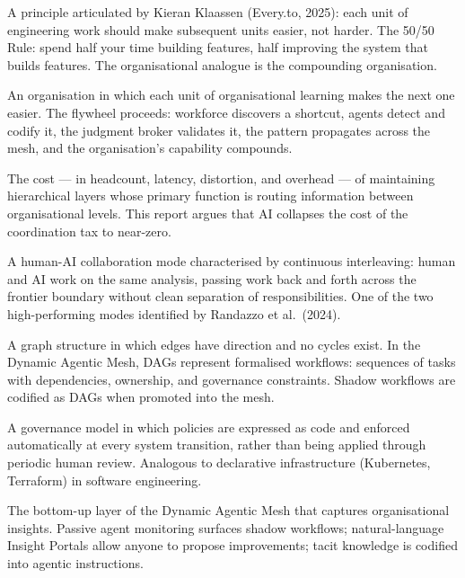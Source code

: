 \begin{description}[style=nextline, leftmargin=2em, font=\bfseries\color{navyblue}]
\item[Compound Engineering]
A principle articulated by Kieran Klaassen (Every.to, 2025): each unit of engineering work should make subsequent units easier, not harder. The 50/50 Rule: spend half your time building features, half improving the system that builds features. The organisational analogue is the compounding organisation.

\item[Compounding Organisation]
An organisation in which each unit of organisational learning makes the next one easier. The flywheel proceeds: workforce discovers a shortcut, agents detect and codify it, the judgment broker validates it, the pattern propagates across the mesh, and the organisation's capability compounds.

\item[Coordination Tax]
The cost --- in headcount, latency, distortion, and overhead --- of maintaining hierarchical layers whose primary function is routing information between organisational levels. This report argues that AI collapses the cost of the coordination tax to near-zero.

\item[Cyborg]
A human-AI collaboration mode characterised by continuous interleaving: human and AI work on the same analysis, passing work back and forth across the frontier boundary without clean separation of responsibilities. One of the two high-performing modes identified by Randazzo et al.\ (2024).

\item[DAG (Directed Acyclic Graph)]
A graph structure in which edges have direction and no cycles exist. In the Dynamic Agentic Mesh, DAGs represent formalised workflows: sequences of tasks with dependencies, ownership, and governance constraints. Shadow workflows are codified as DAGs when promoted into the mesh.

\item[Declarative Governance]
A governance model in which policies are expressed as code and enforced automatically at every system transition, rather than being applied through periodic human review. Analogous to declarative infrastructure (Kubernetes, Terraform) in software engineering.

\item[Discovery Engine]
The bottom-up layer of the Dynamic Agentic Mesh that captures organisational insights. Passive agent monitoring surfaces shadow workflows; natural-language Insight Portals allow anyone to propose improvements; tacit knowledge is codified into agentic instructions.


\end{description}
